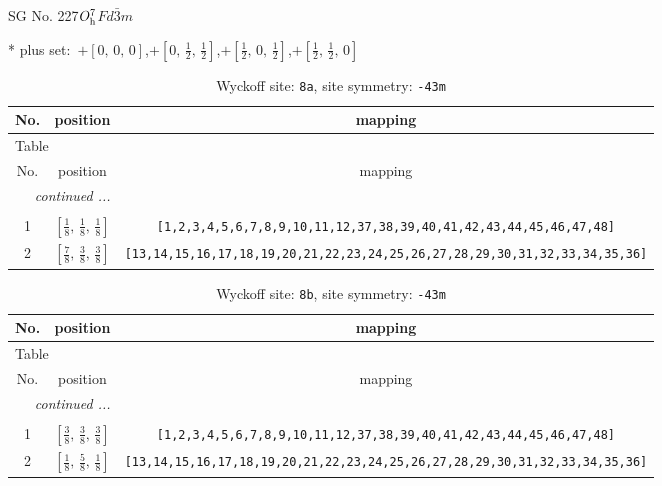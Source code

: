 \documentclass[fleqn,8pt]{jsarticle}
\begin{document}
\setcounter{MaxMatrixCols}{32}

\renewcommand{\tablename}{Table~}
\renewcommand{\figurename}{Figure~}
\begin{center}
\LARGE
SG No. 227\quad$O_{\rm h}^{7}$\quad$Fd\bar{3}m$\quad[ cubic ]
\end{center}
* plus set:\,\,\,$+\left[ 0,\, 0,\, 0 \right]$,\quad $+\left[ 0,\, \frac{1}{2},\, \frac{1}{2} \right]$,\quad $+\left[ \frac{1}{2},\, 0,\, \frac{1}{2} \right]$,\quad $+\left[ \frac{1}{2},\, \frac{1}{2},\, 0 \right]$
\renewcommand{\arraystretch}{1.2}
\begin{longtable}{ccc}
\caption{Wyckoff site: {\tt 8a}, site symmetry: {\tt -43m}}
 \\
 \hline \hline
No. & position & mapping \\ \hline \endfirsthead

\multicolumn{2}{l}{\tablename\ \thetable{}} \\
 \hline \hline
No. & position & mapping \\ \hline \endhead

 \hline \hline
\multicolumn{2}{r}{\footnotesize\it continued ...} \\ \endfoot

 \hline \hline
\multicolumn{2}{r}{} \\ \endlastfoot

1 & $\left[ \frac{1}{8},\, \frac{1}{8},\, \frac{1}{8} \right]$ & {\tt [1,2,3,4,5,6,7,8,9,10,11,12,37,38,39,40,41,42,43,44,45,46,47,48]} \\ \hline
2 & $\left[ \frac{7}{8},\, \frac{3}{8},\, \frac{3}{8} \right]$ & {\tt [13,14,15,16,17,18,19,20,21,22,23,24,25,26,27,28,29,30,31,32,33,34,35,36]} \\
\end{longtable}
\renewcommand{\arraystretch}{1.2}
\begin{longtable}{ccc}
\caption{Wyckoff site: {\tt 8b}, site symmetry: {\tt -43m}}
 \\
 \hline \hline
No. & position & mapping \\ \hline \endfirsthead

\multicolumn{2}{l}{\tablename\ \thetable{}} \\
 \hline \hline
No. & position & mapping \\ \hline \endhead

 \hline \hline
\multicolumn{2}{r}{\footnotesize\it continued ...} \\ \endfoot

 \hline \hline
\multicolumn{2}{r}{} \\ \endlastfoot

1 & $\left[ \frac{3}{8},\, \frac{3}{8},\, \frac{3}{8} \right]$ & {\tt [1,2,3,4,5,6,7,8,9,10,11,12,37,38,39,40,41,42,43,44,45,46,47,48]} \\ \hline
2 & $\left[ \frac{1}{8},\, \frac{5}{8},\, \frac{1}{8} \right]$ & {\tt [13,14,15,16,17,18,19,20,21,22,23,24,25,26,27,28,29,30,31,32,33,34,35,36]} \\
\end{longtable}
\end{document}
